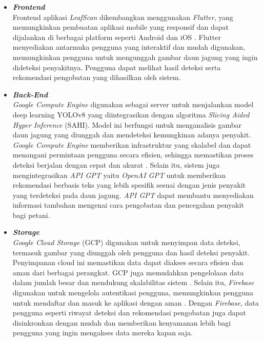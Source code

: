 \documentclass[journal,article,submit,pdftex,moreauthors]{Definitions/mdpi}
\begin{document}
\begin{itemize}
    \item \textbf{\textit{Frontend}} \\
    Frontend aplikasi \textit{LeafScan} dikembangkan menggunakan \textit{Flutter}, yang memungkinkan pembuatan aplikasi mobile yang responsif dan dapat dijalankan di berbagai platform seperti Android dan iOS \cite{ALANAZI2024}. Flutter menyediakan antarmuka pengguna yang interaktif dan mudah digunakan, memungkinkan pengguna untuk mengunggah gambar daun jagung yang ingin dideteksi penyakitnya. Pengguna dapat melihat hasil deteksi serta rekomendasi pengobatan yang dihasilkan oleh sistem.
    
    \item \textbf{\textit{Back-End}} \\
    \textit{Google Compute Engine} digunakan sebagai server untuk menjalankan model deep learning YOLOv8 yang diintegrasikan dengan algoritma \textit{Slicing Aided Hyper Inference} (SAHI). Model ini berfungsi untuk menganalisis gambar daun jagung yang diunggah dan mendeteksi kemungkinan adanya penyakit. \textit{Google Compute Engine} memberikan infrastruktur yang skalabel dan dapat menangani permintaan pengguna secara efisien, sehingga memastikan proses deteksi berjalan dengan cepat dan akurat \cite{VOLKOV2017}. Selain itu, sistem juga mengintegrasikan \textit{API GPT} yaitu \textit{OpenAI GPT} untuk memberikan rekomendasi berbasis teks yang lebih spesifik sesuai dengan jenis penyakit yang terdeteksi pada daun jagung. \textit{API GPT} dapat membantu menyediakan informasi tambahan mengenai cara pengobatan dan pencegahan penyakit bagi petani.
    
    \item \textbf{\textit{Storage}} \\
    \textit{Google Cloud Storage} (GCP) digunakan untuk menyimpan data deteksi, termasuk gambar yang diunggah oleh pengguna dan hasil deteksi penyakit. Penyimpanan cloud ini memastikan data dapat diakses secara efisien dan aman dari berbagai perangkat. GCP juga memudahkan pengelolaan data dalam jumlah besar dan mendukung skalabilitas sistem \cite{LICHTENTDAHL2023}. Selain itu, \textit{Firebase} digunakan untuk mengelola autentikasi pengguna, memungkinkan pengguna untuk mendaftar dan masuk ke aplikasi dengan aman \cite{MARTINS2024}. Dengan \textit{Firebase}, data pengguna seperti riwayat deteksi dan rekomendasi pengobatan juga dapat disinkronkan dengan mudah dan memberikan kenyamanan lebih bagi pengguna yang ingin mengakses data mereka kapan saja.
\end{itemize}
\end{document}
